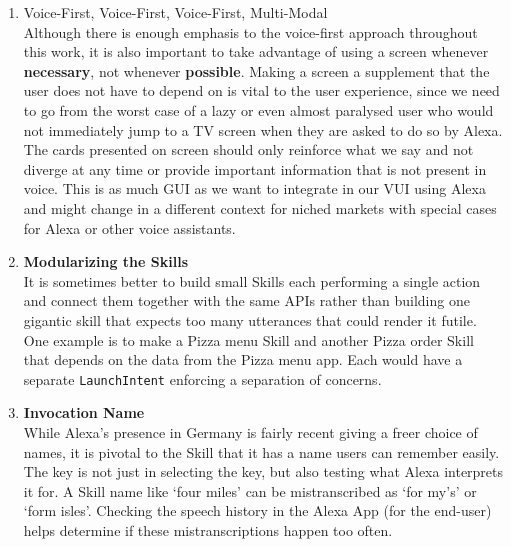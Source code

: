 \begin{enumerate}
\item Voice-First, Voice-First, Voice-First, Multi-Modal\\

Although there is enough emphasis to the voice-first approach throughout this work, it is also important to take advantage of using a screen whenever \textbf{necessary}, not whenever \textbf{possible}. Making a screen a supplement that the user does not have to depend on is vital to the user experience, since we need to go from the worst case of a lazy or even almost paralysed user who would not immediately jump to a TV screen when they are asked to do so by Alexa. The cards presented on screen should only reinforce what we say and not diverge at any time or provide important information that is not present in voice. This is as much GUI as we want to integrate in our VUI using Alexa and might change in a different context for niched markets with special cases for Alexa or other voice assistants.


\item \textbf{Modularizing the Skills}\\
It is sometimes better to build small Skills each performing a single action and connect them together with the same APIs rather than building one gigantic skill that expects too many utterances that could render it futile. One example is to make a Pizza menu Skill and another Pizza order Skill that depends on the data from the Pizza menu app. Each would have a separate \texttt{LaunchIntent} enforcing a separation of concerns.


\item \textbf{Invocation Name}\\

While Alexa's presence in Germany is fairly recent giving a freer choice of names, it is pivotal to the Skill that it has a name users can remember easily. The key is not just in selecting the key, but also testing what Alexa interprets it for. A Skill name like `four miles' can be mistranscribed as `for my's' or `form isles'. Checking the speech history in the Alexa App (for the end-user) helps determine if these mistranscriptions happen too often.



\end{enumerate}
